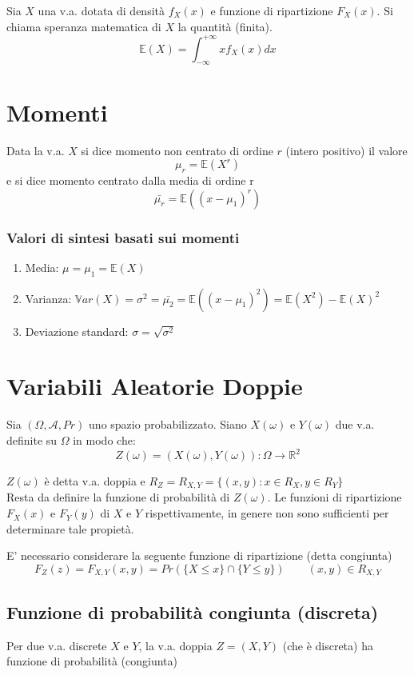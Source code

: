 \documentclass[a4paper]{report}
\begin{document}
  Sia $X$ una v.a. dotata di densità $f_X(x)$ e funzione di ripartizione $F_X(x)$. Si chiama speranza matematica di $X$ la quantità (finita).
  \[ \mathbb{E}(X) = \int_{-\infty}^{+\infty} x f_X(x) dx \]

  \section{Momenti}
  Data la v.a. $X$ si dice momento non centrato di ordine $r$ (intero positivo) il valore
  \[ \mu_r = \mathbb{E}(X^r)\]
  e si dice momento centrato dalla media di ordine r
  \[ \bar{\mu_r} = \mathbb{E}((x-\mu_1)^r)  \]

  \subsubsection{Valori di sintesi basati sui momenti}
  \begin{enumerate}
    \item Media: $ \mu = \mu_1 = \mathbb{E}(X) $
    \item Varianza: $ \mathbb{V}ar(X) = \sigma^2 = \bar{\mu_2} = \mathbb{E}((x-\mu_1)^2) = \mathbb{E}(X^2) - \mathbb{E}(X)^2 $
    \item Deviazione standard: $ \sigma = \sqrt{\sigma^2} $
  \end{enumerate}

  \section{Variabili Aleatorie Doppie}
  Sia $(\Omega, \mathcal{A}, Pr)$ uno spazio probabilizzato. Siano $X(\omega)$ e $Y(\omega)$ due v.a. definite su $\Omega$ in modo che:
  \[ Z(\omega) = (X(\omega),Y(\omega)) : \Omega \rightarrow \mathbb{R}^2 \]

    $Z(\omega)$ è detta v.a. doppia e $R_Z = R_{X,Y} = \{(x,y):x \in R_X,y \in R_Y\}$\\

  Resta da definire la funzione di probabilità di $Z(\omega)$. Le funzioni di ripartizione $F_X(x)$ e $F_Y(y)$ di $X$ e $Y$ rispettivamente, in genere non sono sufficienti per determinare tale propietà.

    E' necessario considerare la seguente funzione di ripartizione (detta congiunta)
  \[ F_Z(z) = F_{X,Y}(x,y) = Pr(\{ X \leq x\} \cap \{ Y \leq y \}) \quad\quad (x,y)\in R_{X,Y} \]

  \subsection{Funzione di probabilità congiunta (discreta)}
  Per due v.a. discrete $X$ e $Y$, la v.a. doppia $Z=(X,Y)$ (che è discreta) ha funzione di probabilità (congiunta)
\end{document}
